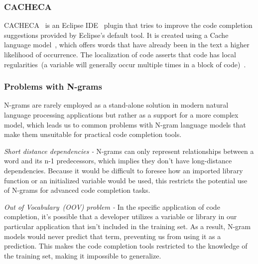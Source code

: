 \subsubsection{CACHECA}
CACHECA~\cite{cacheca} is an Eclipse IDE~\cite{eclipse} plugin that tries to improve the code completion suggestions provided by Eclipse's default tool. It is created using a Cache language model~\cite{localse}, which offers words that have already been in the text a higher likelihood of occurrence. The localization of code asserts that code has local regularities~(a variable will generally occur multiple times in a block of code)~\cite{localse}.

\subsubsection{Problems with N-grams}
N-grams are rarely employed as a stand-alone solution in modern natural language processing applications but rather as a support for a more complex model, which leads us to common problems with N-gram language models that make them unsuitable for practical code completion tools.

\emph{Short distance dependencies -} N-grams can only represent relationships between a word and its n-1 predecessors, which implies they don't have long-distance dependencies. Because it would be difficult to foresee how an imported library function or an initialized variable would be used, this restricts the potential use of N-grams for advanced code completion tasks.

\emph{Out of Vocabulary~(OOV) problem - } In the specific application of code completion, it's possible that a developer utilizes a variable or library in our particular application that isn't included in the training set. 
As a result, N-gram models would never predict that term, preventing us from using it as a prediction. This makes the code completion tools restricted to the knowledge of the training set, making it impossible to generalize.

